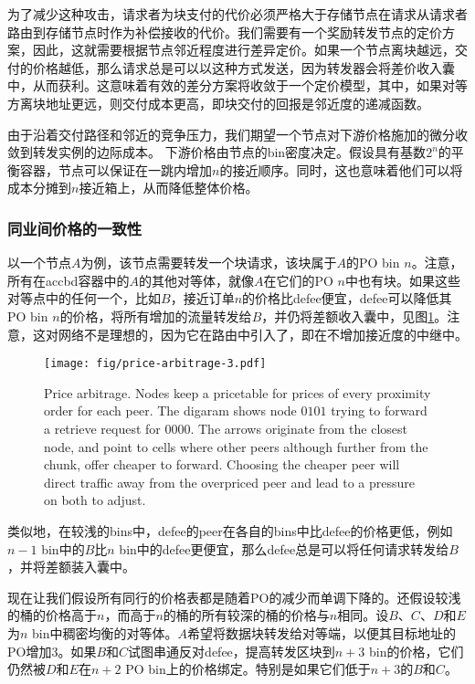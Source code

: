 为了减少这种攻击，请求者为块支付的代价必须严格大于存储节点在请求从请求者路由到存储节点时作为补偿接收的代价。我们需要有一个奖励转发节点的定价方案，因此，这就需要根据节点邻近程度进行差异定价。如果一个节点离块越远，交付的价格越低，那么请求总是可以以这种方式发送，因为转发器会将差价收入囊中，从而获利。这意味着有效的差分方案将收敛于一个定价模型，其中，如果对等方离块地址更远，则交付成本更高，即块交付的回报是邻近度的递减函数。 

由于沿着交付路径和邻近的竞争压力，我们期望一个节点对下游价格施加的微分收敛到转发实例的边际成本。
下游价格由节点的bin密度决定。假设具有基数$2^n$的平衡容器，节点可以保证在一跳内增加$n$的接近顺序。同时，这也意味着他们可以将成本分摊到$n$接近箱上，从而降低整体价格。


\subsubsection{同业间价格的一致性}

以一个节点$A$为例，该节点需要转发一个块请求，该块属于$A$的PO bin $n$。注意，所有在accbd容器中的$A$的其他对等体，就像$A$在它们的PO $n$中也有块。如果这些对等点中的任何一个，比如$B$，接近订单$n$的价格比defee便宜，defee可以降低其PO bin $n$的价格，将所有增加的流量转发给$B$，并仍将差额收入囊中，见图\ref{fig:price-arbitrage}。注意，这对网络不是理想的，因为它在路由中引入了，即在不增加接近度的中继中。 


\begin{figure}[htbp]
   \centering
   \texttt{[image: fig/price-arbitrage-3.pdf]}
    \caption[Price arbitrage \statusgreen]{Price arbitrage. Nodes keep a pricetable for prices of every proximity order for each peer. The digaram shows node $0101$ trying to forward a retrieve request for $0000$. The arrows originate from the closest node, and point to cells where other peers although further from the chunk, offer cheaper to forward. Choosing the cheaper peer will direct traffic away from the overpriced peer and lead to a pressure on both to adjust.}
   \label{fig:price-arbitrage}
\end{figure}
 


类似地，在较浅的bins中，defee的peer在各自的bins中比defee的价格更低，例如$n-1$ bin中的$B$比$n$ bin中的defee更便宜，那么defee总是可以将任何请求转发给$B$，并将差额装入囊中。

现在让我们假设所有同行的价格表都是随着PO的减少而单调下降的。还假设较浅的桶的价格高于$n$，而高于$n$的桶的所有较深的桶的价格与$n$相同。设$B$、$C$、$D$和$E$为$n$ bin中稠密均衡的对等体。$A$希望将数据块转发给对等端，以便其目标地址的PO增加3。如果$B$和$C$试图串通反对defee，提高转发区块到$n+3$ bin的价格，它们仍然被$D$和$E$在$n+2$ PO bin上的价格绑定。特别是如果它们低于$n+3$的$B$和$C$。

